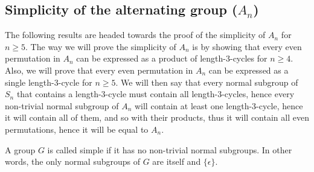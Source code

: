 \subsection{Simplicity of the alternating group ($A_n$)}
The following results are headed towards the proof of the simplicity of $A_n$ for $n \geq 5$. The 
way we will prove the simplicity of $A_n$ is by showing that every even permutation in $A_n$ can 
be expressed as a product of length-3-cycles for $n \geq 4$. Also, we will prove that every 
even permutation in $A_n$ can be expressed as a single length-3-cycle for $n \geq 5$. We will then 
say that every normal subgroup of $S_n$ that contains a length-3-cycle must contain all
length-3-cycles, hence every non-trivial normal subgroup of $A_n$ will contain at least 
one length-3-cycle, hence it will contain all of them, and so with their products, thus it 
will contain all even permutations, hence it will be equal to $A_n$. \\  

\begin{definition}
    A group $G$ is called simple if it has no non-trivial normal subgroups. In other words, the only 
    normal subgroups of $G$ are itself and $\{\epsilon\}$.
\end{definition} \vspace{0.2em}

